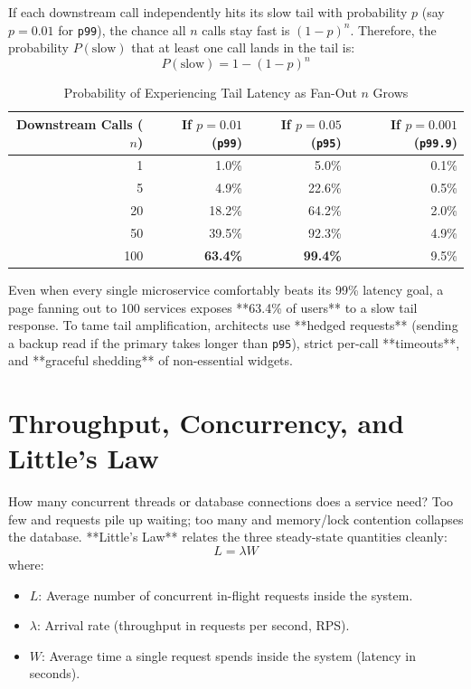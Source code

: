 If each downstream call independently hits its slow tail with probability $p$ (say $p = 0.01$ for \texttt{p99}), the chance all $n$ calls stay fast is $(1 - p)^n$. Therefore, the probability $P(\text{slow})$ that at least one call lands in the tail is:
\begin{equation}
P(\text{slow}) = 1 - (1 - p)^n
\end{equation}

\begin{table}[htbp]
\centering\small
\begin{tabular}{rrrr}
\toprule
\textbf{Downstream Calls ($n$)} & \textbf{If $p = 0.01$ (\texttt{p99})} & \textbf{If $p = 0.05$ (\texttt{p95})} & \textbf{If $p = 0.001$ (\texttt{p99.9})} \\
\midrule
1 & 1.0\% & 5.0\% & 0.1\% \\
5 & 4.9\% & 22.6\% & 0.5\% \\
20 & 18.2\% & 64.2\% & 2.0\% \\
50 & 39.5\% & 92.3\% & 4.9\% \\
100 & \textbf{63.4\%} & \textbf{99.4\%} & 9.5\% \\
\bottomrule
\end{tabular}
\caption{Probability of Experiencing Tail Latency as Fan-Out $n$ Grows}
\label{tab:v5-ch01-tail-amplification}
\end{table}

Even when every single microservice comfortably beats its 99\% latency goal, a page fanning out to 100 services exposes **63.4\% of users** to a slow tail response. To tame tail amplification, architects use **hedged requests** (sending a backup read if the primary takes longer than \texttt{p95}), strict per-call **timeouts**, and **graceful shedding** of non-essential widgets.

\section{Throughput, Concurrency, and Little's Law}

How many concurrent threads or database connections does a service need? Too few and requests pile up waiting; too many and memory/lock contention collapses the database. **Little's Law** relates the three steady-state quantities cleanly:
\begin{equation}
L = \lambda W
\end{equation}
where:
\begin{itemize}[leftmargin=18pt]
  \item $L$: Average number of concurrent in-flight requests inside the system.
  \item $\lambda$: Arrival rate (throughput in requests per second, RPS).
  \item $W$: Average time a single request spends inside the system (latency in seconds).
\end{itemize}


